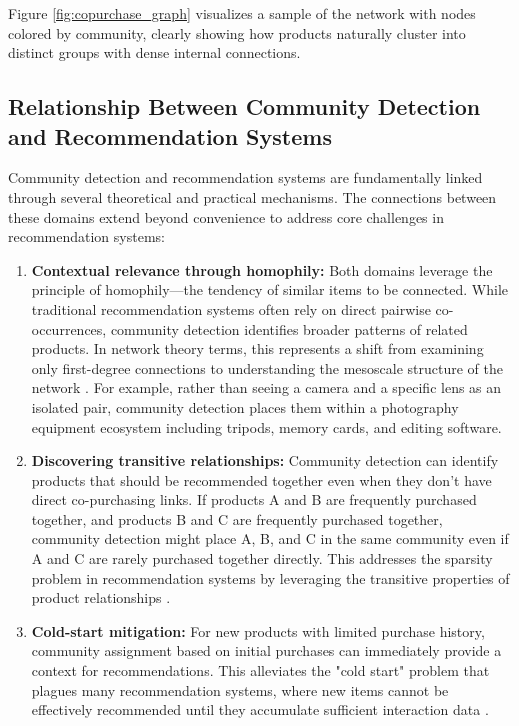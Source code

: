 \documentclass[conference]{IEEEtran}
\begin{document}
Figure \ref{fig:copurchase_graph} visualizes a sample of the network with nodes colored by community, clearly showing how products naturally cluster into distinct groups with dense internal connections.

\subsection{Relationship Between Community Detection and Recommendation Systems}

Community detection and recommendation systems are fundamentally linked through several theoretical and practical mechanisms. The connections between these domains extend beyond convenience to address core challenges in recommendation systems:

\begin{enumerate}
    \item \textbf{Contextual relevance through homophily:} Both domains leverage the principle of homophily—the tendency of similar items to be connected. While traditional recommendation systems often rely on direct pairwise co-occurrences, community detection identifies broader patterns of related products. In network theory terms, this represents a shift from examining only first-degree connections to understanding the mesoscale structure of the network \cite{huang2007applying}. For example, rather than seeing a camera and a specific lens as an isolated pair, community detection places them within a photography equipment ecosystem including tripods, memory cards, and editing software.
    
    \item \textbf{Discovering transitive relationships:} Community detection can identify products that should be recommended together even when they don't have direct co-purchasing links. If products A and B are frequently purchased together, and products B and C are frequently purchased together, community detection might place A, B, and C in the same community even if A and C are rarely purchased together directly. This addresses the sparsity problem in recommendation systems by leveraging the transitive properties of product relationships \cite{sarwar2001item}.
    
    \item \textbf{Cold-start mitigation:} For new products with limited purchase history, community assignment based on initial purchases can immediately provide a context for recommendations. This alleviates the "cold start" problem that plagues many recommendation systems, where new items cannot be effectively recommended until they accumulate sufficient interaction data \cite{ricci2011introduction}.
\end{enumerate}
\end{document}

